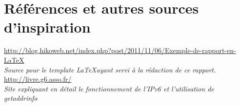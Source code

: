 \section*{Références et autres sources d'inspiration}

\url{http://blog.hikoweb.net/index.php?post/2011/11/06/Exemple-de-rapport-en-LaTeX} \\
\emph{Source pour le template \LaTeX ayant servi à la rédaction de ce rapport.} \\

\url{http://livre.g6.asso.fr/} \\
\emph{Site expliquant en détail le fonctionnement de l'IPv6 et l'utilisation de getaddrinfo} \\

